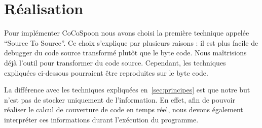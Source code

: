 \section{Réalisation}

Pour implémenter CoCoSpoon nous avons choisi la première technique appelée “Source To Source”. Ce choix s'explique par plusieurs raisons : il est plus facile de debugger du code source transformé plutôt que le byte code. Nous maîtrisions déjà l'outil pour transformer du code source. Cependant, les techniques expliquées ci-dessous pourraient être reproduites sur le byte code. \par La différence avec les techniques expliquées en~\ref{sec:principes} est que notre but n'est pas de stocker uniquement de l'information. En effet, afin de pouvoir réaliser le calcul de couverture de code en temps réel, nous devons également interpréter ces informations durant l'exécution du programme. 
